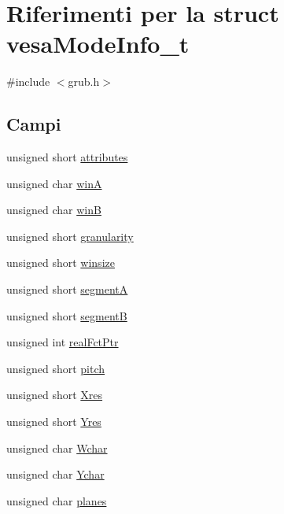 \hypertarget{structvesaModeInfo__t}{\section{Riferimenti per la struct vesa\+Mode\+Info\+\_\+t}
\label{structvesaModeInfo__t}
}


{\ttfamily \#include $<$grub.\+h$>$}

\subsection*{Campi}
\begin{DoxyCompactItemize}
\item 
unsigned short \hyperlink{structvesaModeInfo__t_a339145bcfb50fc81609813734415d4db}{attributes}
\item 
unsigned char \hyperlink{structvesaModeInfo__t_ac056f64b4375a72439ae6e84aae88e7f}{win\+A}
\item 
unsigned char \hyperlink{structvesaModeInfo__t_a386d2bc2570ec21a98664958429247ed}{win\+B}
\item 
unsigned short \hyperlink{structvesaModeInfo__t_a59708e15ac9929ad9218b4ef25f4e861}{granularity}
\item 
unsigned short \hyperlink{structvesaModeInfo__t_a215d7dc86f8c13909156dbff6518d0c8}{winsize}
\item 
unsigned short \hyperlink{structvesaModeInfo__t_af83d59348e11c50399f088cea83fb0a9}{segment\+A}
\item 
unsigned short \hyperlink{structvesaModeInfo__t_a3f8f6fe3c4ee7fdbca2cf15883db343f}{segment\+B}
\item 
unsigned int \hyperlink{structvesaModeInfo__t_a3c3c1fa91bfb8ec58a80ff0b9c1deaae}{real\+Fct\+Ptr}
\item 
unsigned short \hyperlink{structvesaModeInfo__t_aed2e5dc0be6bd66efb67ab3de2191bfe}{pitch}
\item 
unsigned short \hyperlink{structvesaModeInfo__t_a5ed5fe4414e2a46fa3670733486905ae}{Xres}
\item 
unsigned short \hyperlink{structvesaModeInfo__t_a54003f0083b0581fc14babfec48a1d7d}{Yres}
\item 
unsigned char \hyperlink{structvesaModeInfo__t_a154546a781d9a7d5da7cc0b77a7b998c}{Wchar}
\item 
unsigned char \hyperlink{structvesaModeInfo__t_a1c395c3097057ffd0f3d12ea9df6133d}{Ychar}
\item 
unsigned char \hyperlink{structvesaModeInfo__t_a9d1ab189d261e008a41daa04d5ee9693}{planes}

\end{DoxyCompactItemize}

